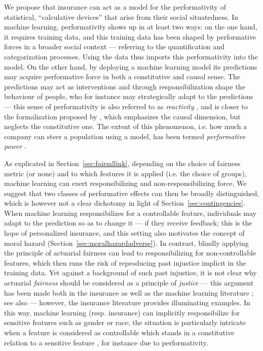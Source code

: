 \documentclass[11pt]{article} %
\makeatletter
\newcommand*{\ie}{i.e.\@\xspace}
\makeatother
\begin{document}
We propose that insurance can act as a model for the performativity of statistical, ``calculative devices'' \citep{van2014politics} that arise from their social situatedness. In machine learning, performativity shows up in at least two ways: on the one hand, it requires training data, and this training data has been shaped by performative forces in a broader social context --- referring to the quantification and categorization processes. Using the data thus imports this performativity into the model. On the other hand, by deploying a machine learning model its predictions may acquire performative force in both a constitutive and causal sense. The predictions may act as interventions and through responsibilization shape the behaviour of people, who for instance may strategically adapt to the predictions --- this sense of performativity is also referred to as \textit{reactivity} \citep{espeland2007rankings,espeland2008sociology}, and is closer to the formalization proposed by \citet{perdomo2020performative}, which emphasizes the causal dimension, but neglects the constitutive one. The extent of this phenomenon, \ie how much a company can steer a population using a model, has been termed \textit{performative power} \citep{hardt2022performative}.

As explicated in Section~\ref{sec:fairmllink}, depending on the choice of fairness metric (or none) and to which features it is applied (\ie the choice of groups), machine learning can exert responsibilizing and non-responsibilizing force. We suggest that two classes of performative effects can then be broadly distinguished, which is however not a clear dichotomy in light of Section~\ref{sec:contingencies}. When machine learning responsibilizes for a controllable feature, individuals may adapt to the prediction so as to change it --- if they receive feedback; this is the hope of personalized insurance, and this setting also motivates the concept of moral hazard (Section~\ref{sec:moralhazardadverse}). In contrast, blindly applying the principle of actuarial fairness can lead to responsibilizing for non-controllable features, which then runs the risk of reproducing past injustice implicit in the training data. Yet against a background of such past injustice, it is not clear why actuarial \textit{fairness} should be considered as a principle of \textit{justice} --- this argument has been made both in the insurance \citep{daniels1990insurability,lehtonen2015producing,barry2020insurance} as well as the machine learning literature \citep{mitchell2021algorithmic,vredenburghfairness,green2022escaping,kasirzadeh2022algorithmic}; see also \citep{eidelson2021patterned} --- however, the insurance literature provides illuminating examples. In this way, machine learning (resp.\@\xspace insurance) can implicitly responsibilize for sensitive features such as gender or race; the situation is particularly intricate when a feature is considered as controllable which stands in a constitutive relation to a sensitive feature \citep{hu2020s}, for instance due to performativity.
\end{document}
